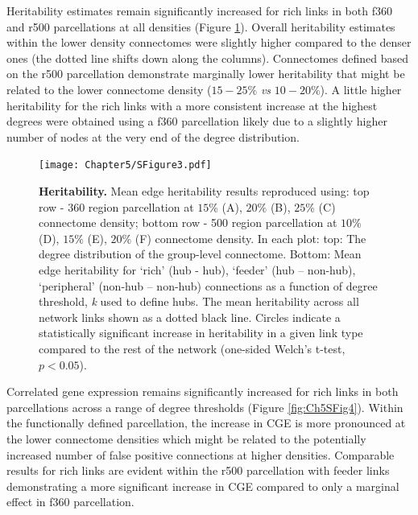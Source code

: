 \newpage
Heritability estimates remain significantly increased for rich links in both f360 and r500 parcellations at all densities (Figure \ref{fig:Ch5SFig3}). Overall heritability estimates within the lower density connectomes were slightly higher compared to the denser ones (the dotted line shifts down along the columns). Connectomes defined based on the r500 parcellation demonstrate marginally lower heritability that might be related to the lower connectome density ($15-25\%$ \textit{vs} $10-20\%$). A little higher heritability for the rich links with a more consistent increase at the highest degrees were obtained using a f360 parcellation likely due to a slightly higher number of nodes at the very end of the degree distribution. 

\begin{figure}[h!]
\begin{center}
\texttt{[image: Chapter5/SFigure3.pdf]}%
\end{center}
\caption{\textbf{Heritability.} 
Mean edge heritability results reproduced using: top row - 360 region parcellation at $15\%$ (A), $20\%$ (B), $25\%$ (C) connectome density; bottom row - 500 region parcellation at $10\%$ (D), $15\%$ (E), $20\%$ (F) connectome density. In each plot: top: The degree distribution of the group-level connectome. Bottom: Mean edge heritability for `rich' (hub - hub), `feeder' (hub – non-hub), `peripheral' (non-hub – non-hub) connections as a function of degree threshold, \textit{k} used to define hubs. The mean heritability across all network links shown as a dotted black line. Circles indicate a statistically significant increase in heritability in a given link type compared to the rest of the network (one-sided Welch's t-test, $p < 0.05$).}
\label{fig:Ch5SFig3}
\end{figure}

\newpage
Correlated gene expression remains significantly increased for rich links in both parcellations across a range of degree thresholds (Figure \ref{fig:Ch5SFig4}). Within the functionally defined parcellation, the increase in CGE is more pronounced at the lower connectome densities which might be related to the potentially increased number of false positive connections at higher densities. Comparable results for rich links are evident within the r500 parcellation with feeder links demonstrating a more significant increase in CGE compared to only a marginal effect in f360 parcellation. 

